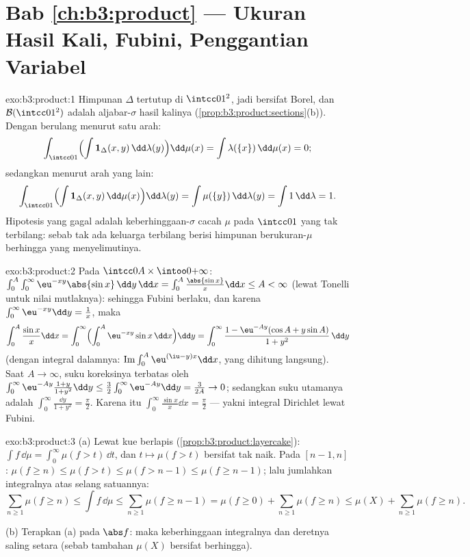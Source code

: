 \section*{Bab \ref{ch:b3:product} --- Ukuran Hasil Kali,
Fubini, Penggantian Variabel}

\begin{solution}{exo:b3:product:1}
Himpunan $\Delta$ tertutup di $\intcc01^2$, jadi bersifat Borel, dan $\mathcal
B(\intcc01^2)$ adalah aljabar-$\sigma$ hasil kalinya
(\cref{prop:b3:product:sections}(b)). Dengan berulang menurut satu arah:
\[
\int_{\intcc01}\Bigl(\int \mathbf 1_\Delta(x,y)
\,\dd\lambda(y)\Bigr)\dd\mu(x)
= \int \lambda(\{x\})\,\dd\mu(x) = 0 ;
\]
sedangkan menurut arah yang lain:
\[
\int_{\intcc01}\Bigl(\int\mathbf
1_\Delta(x,y)\,\dd\mu(x)\Bigr)\dd\lambda(y)
= \int \mu(\{y\})\,\dd\lambda(y) = \int 1\,\dd\lambda = 1 .
\]
Hipotesis yang gagal adalah keberhinggaan-$\sigma$  cacah
$\mu$ pada $\intcc01$ yang tak terbilang: sebab tak ada keluarga
terbilang berisi himpunan berukuran-$\mu$ berhingga yang menyelimutinya.
\end{solution}

\begin{solution}{exo:b3:product:2}
Pada $\intcc0A\times\intoo0{+\infty}$:
$\int_0^A\int_0^\infty\eu^{-xy}\abs{\sin x}\,\dd y\,\dd x =
\int_0^A\frac{\abs{\sin x}}x\dd x \leq A < \infty$ (lewat Tonelli untuk
nilai mutlaknya): sehingga Fubini berlaku, dan karena
$\int_0^\infty\eu^{-xy}\dd y = \frac1x$, maka
\[
\int_0^A\frac{\sin x}x\dd x
= \int_0^\infty\Bigl(\int_0^A\eu^{-xy}\sin x\,\dd
x\Bigr)\dd y
= \int_0^\infty \frac{1 - \eu^{-Ay}(\cos A + y\sin A)}{1 +
y^2}\,\dd y
\]
(dengan integral dalamnya: $\operatorname{Im}\int_0^A\eu^{(\iu -
y)x}\dd x$, yang dihitung langsung). Saat $A \to \infty$,
suku koreksinya terbatas oleh $\int_0^\infty\eu^{-Ay}\frac{1 +
y}{1 + y^2}\dd y \leq \frac32\int_0^\infty\eu^{-Ay}\dd y =
\frac3{2A} \to 0$; sedangkan suku utamanya adalah
$\int_0^\infty\frac{\dd y}{1+y^2} = \frac\pi2$. Karena itu
$\int_0^\infty\frac{\sin x}x\dd x = \frac\pi2$ --- yakni integral
Dirichlet lewat Fubini.
\end{solution}

\begin{solution}{exo:b3:product:3}
(a) Lewat kue berlapis (\cref{prop:b3:product:layercake}): $\int
f\,\dd\mu = \int_0^\infty\mu(f > t)\,\dd t$, dan $t \mapsto
\mu(f > t)$ bersifat tak naik. Pada $[n-1, n]$: $\mu(f \geq n)
\leq \mu(f > t) \leq \mu(f > n - 1) \leq \mu(f \geq n - 1)$;
lalu jumlahkan integralnya atas selang satuannya:
\[
\sum_{n\geq1}\mu(f \geq n) \leq \int f\,\dd\mu \leq
\sum_{n\geq1}\mu(f \geq n - 1) = \mu(f \geq 0) +
\sum_{n\geq1}\mu(f\geq n) \leq \mu(X) + \sum_{n\geq1}\mu(f\geq
n).
\]

(b) Terapkan (a) pada $\abs f$: maka keberhinggaan integralnya dan
deretnya saling setara (sebab tambahan $\mu(X)$ bersifat berhingga).
\end{solution}


